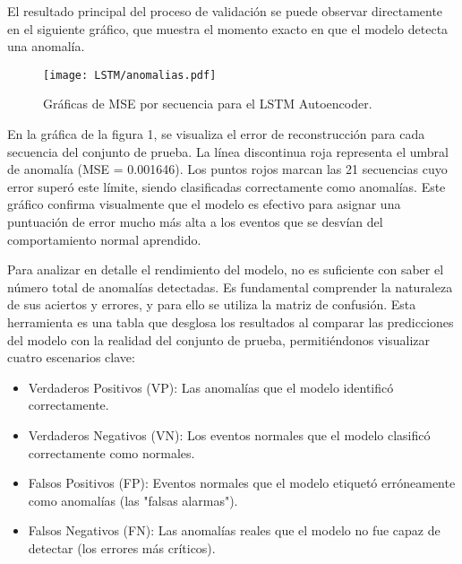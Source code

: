 El resultado principal del proceso de validación se puede observar directamente en el siguiente gráfico, que muestra el momento exacto en que el modelo detecta una anomalía.

\begin{figure}[ht!]
      \centering
      \texttt{[image: LSTM/anomalias.pdf]}
      \caption{Gráficas de MSE por secuencia para el LSTM Autoencoder.}
      \label{fig:mse_lstm}
\end{figure}

En la gráfica de la figura 1, se visualiza el error de reconstrucción para cada secuencia del conjunto de prueba. La línea discontinua roja representa el umbral de anomalía (MSE = 0.001646). Los puntos rojos marcan las 21 secuencias cuyo error superó este límite, siendo clasificadas correctamente como anomalías. Este gráfico confirma visualmente que el modelo es efectivo para asignar una puntuación de error mucho más alta a los eventos que se desvían del comportamiento normal aprendido.

Para analizar en detalle el rendimiento del modelo, no es suficiente con saber el número total de anomalías detectadas. Es fundamental comprender la naturaleza de sus aciertos y errores, y para ello se utiliza la matriz de confusión. Esta herramienta es una tabla que desglosa los resultados al comparar las predicciones del modelo con la realidad del conjunto de prueba, permitiéndonos visualizar cuatro escenarios clave:

\begin{itemize}
      \item Verdaderos Positivos (VP): Las anomalías que el modelo identificó correctamente.
      \item Verdaderos Negativos (VN): Los eventos normales que el modelo clasificó correctamente como normales.
      \item Falsos Positivos (FP): Eventos normales que el modelo etiquetó erróneamente como anomalías (las "falsas alarmas").
      \item Falsos Negativos (FN): Las anomalías reales que el modelo no fue capaz de detectar (los errores más críticos).
\end{itemize}

